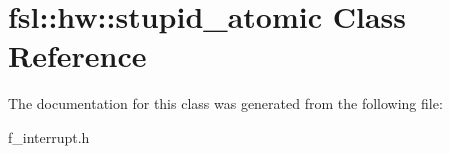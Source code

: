 \hypertarget{classfsl_1_1hw_1_1stupid__atomic}{}\section{fsl\+::hw\+::stupid\+\_\+atomic Class Reference}
\label{classfsl_1_1hw_1_1stupid__atomic}


The documentation for this class was generated from the following file\+:\begin{DoxyCompactItemize}
\item 
f\+\_\+interrupt.\+h\end{DoxyCompactItemize}
